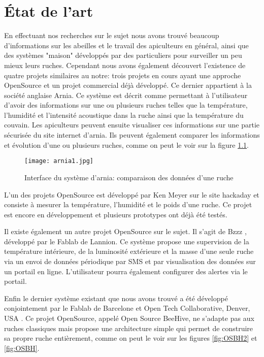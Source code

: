 ﻿\chapter{État de l'art}

En effectuant nos recherches sur le sujet nous avons trouvé beaucoup d'informations sur les abeilles et le travail des apiculteurs en général, ainsi que des systèmes "maison" développés par des particuliers pour surveiller un peu mieux leurs ruches. Cependant nous avons également découvert l'existence de quatre projets similaires au notre: trois projets en cours ayant une approche OpenSource et un projet commercial déjà développé. Ce dernier appartient à la société anglaise Arnia. Ce système est décrit \cite{arnia} comme permettant à l'utilisateur d'avoir des informations sur une ou plusieurs ruches telles que la température, l'humidité et l'intensité acoustique dans la ruche ainsi que la température du couvain. Les apiculteurs peuvent ensuite visualiser ces informations sur une partie sécurisée du site internet d'arnia. Ils peuvent également comparer les informations et évolution d'une ou plusieurs ruches, comme on peut le voir sur la figure \ref{fig:arnia1}.

\begin{figure}[h]
\centering\texttt{[image: arnia1.jpg]}
\caption{\label{fig:arnia1} Interface du système d'arnia: comparaison des données d'une ruche}
\end{figure}

L'un des projets OpenSource est développé par Ken Meyer sur le site hackaday \cite{hackaday} et consiste à mesurer la température, l'humidité et le poids d'une ruche. Ce projet est encore en développement et plusieurs prototypes ont déjà été testés.

Il existe également un autre projet OpenSource sur le sujet. Il s'agit de Bzzz \cite{projetBzzz}, développé par le Fablab de Lannion. Ce système propose une supervision de la température intérieure, de la luminosité extérieure et la masse d'une seule ruche via un envoi de données périodique par SMS et par visualisation des données sur un portail en ligne. L'utilisateur pourra également configurer des alertes via le portail.

Enfin le dernier système existant que nous avons trouvé a été développé conjointement par le Fablab de Barcelone et Open Tech Collaborative, Denver, USA \cite{OpenBeehives}. Ce projet OpenSource, appelé Open Source BeeHive, ne s'adapte pas aux ruches classiques mais propose une architecture simple qui permet de construire sa propre ruche entièrement, comme on peut le voir sur les figures \ref{fig:OSBH2} et \ref{fig:OSBH}.

